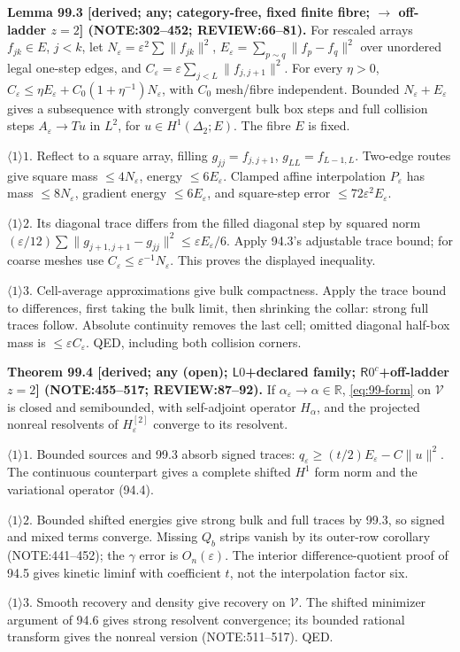 \textbf{Lemma 99.3 [derived; any; category-free, fixed finite fibre; \(\to\) off-ladder \(z=2\)]
(NOTE:302--452; REVIEW:66--81).}
For rescaled arrays \(f_{jk}\in E\), \(j<k\), let \(N_\varepsilon=\varepsilon^2\sum\|f_{jk}\|^2\),
\(E_\varepsilon=\sum_{p\sim q}\|f_p-f_q\|^2\) over unordered legal one-step edges, and
\(C_\varepsilon=\varepsilon\sum_{j<L}\|f_{j,j+1}\|^2\). For every \(\eta>0\),
\(C_\varepsilon\le\eta E_\varepsilon+C_0(1+\eta^{-1})N_\varepsilon\), with \(C_0\) mesh/fibre independent.
Bounded \(N_\varepsilon+E_\varepsilon\) gives a subsequence with strongly convergent bulk box steps and full
collision steps \(A_\varepsilon\to Tu\) in \(L^2\), for \(u\in H^1(\Delta_2;E)\). The fibre \(E\) is fixed.
\par\(\langle1\rangle1\). Reflect to a square array, filling \(g_{jj}=f_{j,j+1}\), \(g_{LL}=f_{L-1,L}\).
Two-edge routes give square mass \(\le4N_\varepsilon\), energy \(\le6E_\varepsilon\). Clamped affine interpolation
\(P_\varepsilon\) has mass \(\le8N_\varepsilon\), gradient energy \(\le6E_\varepsilon\), and square-step error \(\le72\varepsilon^2E_\varepsilon\).
\par\(\langle1\rangle2\). Its diagonal trace differs from the filled diagonal step by squared norm
\((\varepsilon/12)\sum\|g_{j+1,j+1}-g_{jj}\|^2\le\varepsilon E_\varepsilon/6\). Apply 94.3's adjustable trace bound;
for coarse meshes use \(C_\varepsilon\le\varepsilon^{-1}N_\varepsilon\). This proves the displayed inequality.
\par\(\langle1\rangle3\). Cell-average approximations give bulk compactness. Apply the trace bound to differences,
first taking the bulk limit, then shrinking the collar: strong full traces follow. Absolute continuity removes
the last cell; omitted diagonal half-box mass is \(\le\varepsilon C_\varepsilon\). QED, including both collision corners.

\textbf{Theorem 99.4 [derived; any (open); \(\mathsf L0\)+declared family; \(\mathsf R0^c\)+off-ladder \(z=2\)]
(NOTE:455--517; REVIEW:87--92).}
If \(\alpha_\varepsilon\to\alpha\in\mathbb R\), \eqref{eq:99-form} on \(\mathcal V\) is closed and semibounded, with
self-adjoint operator \(H_\alpha\), and the projected nonreal resolvents of \(H_\varepsilon^{[2]}\) converge to its resolvent.
\par\(\langle1\rangle1\). Bounded sources and 99.3 absorb signed traces: \(q_\varepsilon\ge(t/2)E_\varepsilon-C\|u\|^2\).
The continuous counterpart gives a complete shifted \(H^1\) form norm and the variational operator (94.4).
\par\(\langle1\rangle2\). Bounded shifted energies give strong bulk and full traces by 99.3, so signed and mixed terms converge.
Missing \(Q_b\) strips vanish by its outer-row corollary (NOTE:441--452); the \(\gamma\) error is \(O_n(\varepsilon)\).
The interior difference-quotient proof of 94.5 gives kinetic liminf with coefficient \(t\), not the interpolation factor six.
\par\(\langle1\rangle3\). Smooth recovery and density give recovery on \(\mathcal V\). The shifted minimizer argument of 94.6
gives strong resolvent convergence; its bounded rational transform gives the nonreal version (NOTE:511--517). QED.


